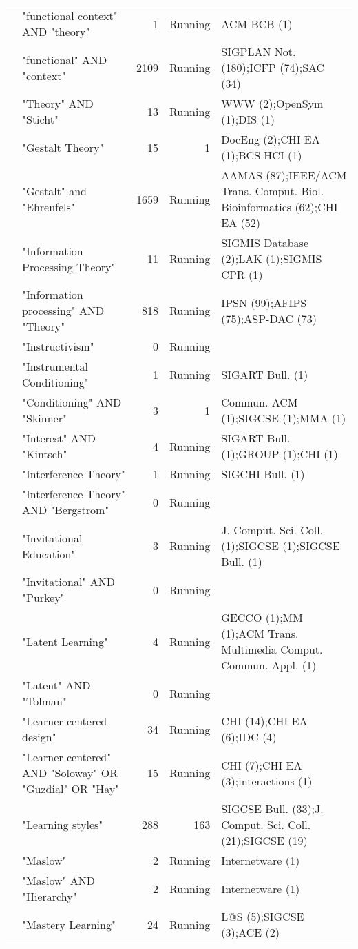 \begin{table*}[t]
\begin{tabular}{lp{7cm}rrp{3cm}}
& "functional context" AND "theory" & 1 & Running & ACM-BCB  (1) \\
& "functional" AND "context" & 2109 & Running & SIGPLAN Not. (180);ICFP  (74);SAC  (34) \\
& "Theory" AND "Sticht" & 13 & Running & WWW  (2);OpenSym  (1);DIS  (1) \\
& "Gestalt Theory" & 15 & 1 & DocEng  (2);CHI EA  (1);BCS-HCI  (1) \\
& "Gestalt" and "Ehrenfels" & 1659 & Running & AAMAS  (87);IEEE/ACM Trans. Comput. Biol. Bioinformatics (62);CHI EA  (52) \\
& "Information Processing Theory" & 11 & Running & SIGMIS Database (2);LAK  (1);SIGMIS CPR  (1) \\
& "Information processing" AND "Theory" & 818 & Running & IPSN  (99);AFIPS  (75);ASP-DAC  (73) \\
& "Instructivism" & 0 & Running &  \\
& "Instrumental Conditioning" & 1 & Running & SIGART Bull. (1) \\
& "Conditioning" AND "Skinner" & 3 & 1 & Commun. ACM (1);SIGCSE  (1);MMA  (1) \\
& "Interest" AND "Kintsch" & 4 & Running & SIGART Bull. (1);GROUP  (1);CHI  (1) \\
& "Interference Theory" & 1 & Running & SIGCHI Bull. (1) \\
& "Interference Theory" AND "Bergstrom" & 0 & Running &  \\
& "Invitational Education" & 3 & Running & J. Comput. Sci. Coll. (1);SIGCSE  (1);SIGCSE Bull. (1) \\
& "Invitational" AND "Purkey" & 0 & Running &  \\
& "Latent Learning" & 4 & Running & GECCO  (1);MM  (1);ACM Trans. Multimedia Comput. Commun. Appl. (1) \\
& "Latent" AND "Tolman" & 0 & Running &  \\
& "Learner-centered design" & 34 & Running & CHI  (14);CHI EA  (6);IDC  (4) \\
& "Learner-centered" AND "Soloway" OR "Guzdial" OR "Hay" & 15 & Running & CHI  (7);CHI EA  (3);interactions (1) \\
& "Learning styles" & 288 & 163 & SIGCSE Bull. (33);J. Comput. Sci. Coll. (21);SIGCSE  (19) \\
& "Maslow" & 2 & Running & Internetware  (1) \\
& "Maslow" AND "Hierarchy" & 2 & Running & Internetware  (1) \\
& "Mastery Learning" & 24 & Running & L@S  (5);SIGCSE  (3);ACE  (2) \\

\end{tabular}
\end{table*}
